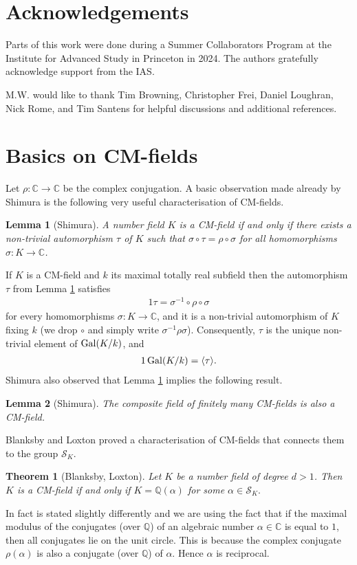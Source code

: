 \documentclass[11pt]{amsart}
\newtheorem{theorem}{Theorem}[section]
\newtheorem{lemma}{Lemma}[section]
\numberwithin{equation}{eqncounter}
\def\IC{\mathbb C}
\def\IQ{\mathbb Q}
\def\Gal{\mathop{\rm Gal}\nolimits}
\def\Sc{\mathcal{S}}
\def\Gal{\mathop{{\rm Gal}}\nolimits}
\begin{document}
\section*{Acknowledgements}
Parts  of this work were done during a Summer Collaborators Program at the Institute for 
Advanced Study in  Princeton in 2024.
The authors gratefully acknowledge support from the IAS. 

M.W. would like  to thank Tim Browning, Christopher Frei, Daniel Loughran, Nick Rome, and Tim Santens for  helpful discussions and additional references. 


\section{Basics on CM-fields}\label{sec:basics}
Let $\rho: \IC \to \IC$ be the complex conjugation. A basic observation made 
already by Shimura \cite[18.2. Lemma (i)]{shimura1998} is the following very useful characterisation of CM-fields.
\begin{lemma}[Shimura]\label{lem:Shimura}
A number field  $K$ is a CM-field if and only if there exists a non-trivial automorphism $\tau$ of $K$ such that $\sigma\circ\tau=\rho\circ \sigma$ for all homomorphisms $\sigma: K \to \IC$. 
\end{lemma}
If $K$ is a CM-field and $k$ its maximal totally real subfield then the automorphism
$\tau$ from Lemma \ref{lem:Shimura} satisfies
\begin{alignat}1\label{eq:tau}
\tau=\sigma^{-1}\circ \rho \circ \sigma
\end{alignat}
for every homomorphisms $\sigma: K \to \IC$, and it is  a non-trivial automorphism of 
$K$ fixing $k$ (we drop $\circ$ and simply write $\sigma^{-1}\rho\sigma$).
Consequently, $\tau$ is the unique non-trivial element of $\Gal(K/k)$, and
\begin{alignat}1\label{eq:gentau}
\Gal(K/k)=\langle \tau\rangle.
\end{alignat}
Shimura \cite[18.2. Lemma (ii)]{shimura1998} also observed that Lemma \ref{lem:Shimura} implies the following result. 
\begin{lemma}[Shimura]\label{cor:comp}
The composite field of finitely many CM-fields is also a CM-field. 
\end{lemma}




Blanksby and Loxton \cite[Theorem 1]{blanksby1978} proved a characterisation of CM-fields
that connects them to the group $\Sc_K$.
\begin{theorem}[Blanksby, Loxton]\label{thm:BlanksbyLoxton}
Let $K$ be a number field of degree $d>1$. Then 
$K$ is a CM-field if and only if $K=\IQ(\alpha)$ for some $\alpha\in \Sc_K.$
\end{theorem}
In fact \cite[Theorem 1]{blanksby1978} is stated slightly differently and we are using the fact that if the maximal modulus of the
conjugates (over $\IQ$) of an algebraic number $\alpha\in \IC$  is equal to $1$, then all conjugates lie on the unit circle. This is because
the complex conjugate $\rho(\alpha)$ is also a conjugate (over $\IQ$) of $\alpha$. Hence $\alpha$ is reciprocal. 
\end{document}
